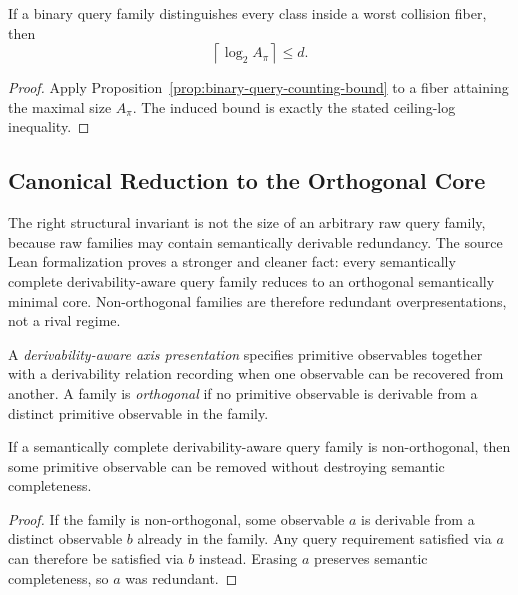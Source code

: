 \begin{corollary}\label{cor:worst-fiber-query-lower-bound}
If a binary query family distinguishes every class inside a worst collision fiber, then
\[
\left\lceil \log_2 A_{\pi} \right\rceil \le d.
\]
\end{corollary}

\begin{proof}
Apply Proposition~\ref{prop:binary-query-counting-bound} to a fiber attaining the maximal size $A_{\pi}$. The induced bound is exactly the stated ceiling-log inequality.
\end{proof}

\subsection{Canonical Reduction to the Orthogonal Core}

The right structural invariant is not the size of an arbitrary raw query family, because raw families may contain semantically derivable redundancy. The source Lean formalization proves a stronger and cleaner fact: every semantically complete derivability-aware query family reduces to an orthogonal semantically minimal core. Non-orthogonal families are therefore redundant overpresentations, not a rival regime.

\begin{definition}
A \emph{derivability-aware axis presentation} specifies primitive observables together with a derivability relation recording when one observable can be recovered from another. A family is \emph{orthogonal} if no primitive observable is derivable from a distinct primitive observable in the family.
\end{definition}

\begin{proposition}\label{prop:query-redundancy}
If a semantically complete derivability-aware query family is non-orthogonal, then some primitive observable can be removed without destroying semantic completeness.
\end{proposition}

\begin{proof}
If the family is non-orthogonal, some observable $a$ is derivable from a distinct observable $b$ already in the family. Any query requirement satisfied via $a$ can therefore be satisfied via $b$ instead. Erasing $a$ preserves semantic completeness, so $a$ was redundant.
\end{proof}

